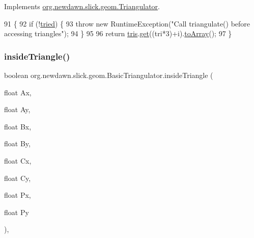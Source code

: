 Implements \mbox{\hyperlink{interfaceorg_1_1newdawn_1_1slick_1_1geom_1_1_triangulator_a0142ec1a5f11292813f0f4e9a1407efb}{org.\+newdawn.\+slick.\+geom.\+Triangulator}}.


\begin{DoxyCode}
91                                                     \{
92         \textcolor{keywordflow}{if} (!\mbox{\hyperlink{classorg_1_1newdawn_1_1slick_1_1geom_1_1_basic_triangulator_adc09d95b55a0bca60e6d63df97735ce4}{tried}}) \{
93             \textcolor{keywordflow}{throw} \textcolor{keyword}{new} RuntimeException(\textcolor{stringliteral}{"Call triangulate() before accessing triangles"});
94         \}
95         
96         \textcolor{keywordflow}{return} \mbox{\hyperlink{classorg_1_1newdawn_1_1slick_1_1geom_1_1_basic_triangulator_af35de217f51e551e95179a91b06c59f2}{tris}}.\mbox{\hyperlink{classorg_1_1newdawn_1_1slick_1_1geom_1_1_basic_triangulator_1_1_point_list_ae1c25c4d9e9a4064036b06328cb14b2d}{get}}((tri*3)+i).\mbox{\hyperlink{classorg_1_1newdawn_1_1slick_1_1geom_1_1_basic_triangulator_1_1_point_acb4b7fb3bab66540d7cad1c662415c56}{toArray}}();
97     \}
\end{DoxyCode}
\mbox{\label{classorg_1_1newdawn_1_1slick_1_1geom_1_1_basic_triangulator_a158a57682ae893087827b8c7fd24e68a}} 
\subsubsection{\texorpdfstring{inside\+Triangle()}{insideTriangle()}}
{\footnotesize\ttfamily boolean org.\+newdawn.\+slick.\+geom.\+Basic\+Triangulator.\+inside\+Triangle (\begin{DoxyParamCaption}\item[{float}]{Ax,  }\item[{float}]{Ay,  }\item[{float}]{Bx,  }\item[{float}]{By,  }\item[{float}]{Cx,  }\item[{float}]{Cy,  }\item[{float}]{Px,  }\item[{float}]{Py }\end{DoxyParamCaption})\hspace{0.3cm}{\ttfamily [inline]}, {\ttfamily [private]}}

